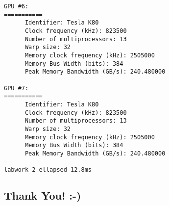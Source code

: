 \documentclass[10pt]{article}
\begin{document}
\begin{verbatim}
GPU #6:
===========
      Identifier: Tesla K80
      Clock frequency (kHz): 823500
      Number of multiprocessors: 13
      Warp size: 32
      Memory clock frequency (kHz): 2505000
      Memory Bus Width (bits): 384
      Peak Memory Bandwidth (GB/s): 240.480000

GPU #7:
===========
      Identifier: Tesla K80
      Clock frequency (kHz): 823500
      Number of multiprocessors: 13
      Warp size: 32
      Memory clock frequency (kHz): 2505000
      Memory Bus Width (bits): 384
      Peak Memory Bandwidth (GB/s): 240.480000

labwork 2 ellapsed 12.8ms
\end{verbatim}

\subsection*{Thank You! :-)}
\end{document}
